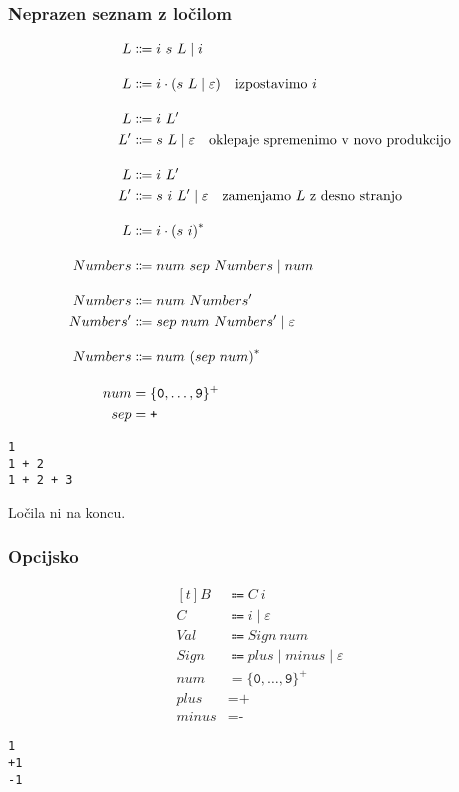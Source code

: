 \documentclass{report}
\newcommand{\Null}{\varepsilon}
\newcommand{\Char}[1]{\texttt{#1}}
\newcommand{\Seq}{\cdot}
\newcommand{\Spc}{\ }
\newcommand{\Union}{\mathrel{|}}
\newcommand{\Kleene}[1]{{#1}^\ast}
\newcommand{\KleenePlus}[1]{#1^+}
\newcommand{\Arrow}{\Coloneq}
\newcommand{\NT}[1]{{#1}}
\newcommand{\T}[1]{{#1}}
\begin{document}
\subsubsection{Neprazen seznam z ločilom}
\begin{equation*}
  \begin{aligned}[t]
    \NT{L} &\Arrow \T{i} \Spc \T{s} \Spc \NT{L} \Union \T{i}\\[1em]
    \NT{L} &\Arrow \T{i} \Seq (\T{s} \Spc \NT{L} \Union \Null)\text{\quad izpostavimo $\T{i}$}\\[1em]
    \NT{L} &\Arrow \T{i} \Spc \NT{L'}\\
    \NT{L'} &\Arrow \T{s} \Spc \NT{L} \Union \Null \text{\quad oklepaje spremenimo v novo produkcijo}\\[1em]
    \NT{L} &\Arrow \T{i} \Spc \NT{L'}\\
    \NT{L'} &\Arrow \T{s} \Spc \T{i} \Spc \NT{L'} \Union \Null \text{\quad zamenjamo $\NT{L}$ z desno stranjo}\\[1em]
    \NT{L} &\Arrow \T{i} \Seq \Kleene{(\T{s} \Spc \T{i})}\\[1em]
    \NT{Numbers} &\Arrow \T{num} \Spc \T{sep} \Spc \NT{Numbers} \Union \T{num}\\[1em]
    \NT{Numbers} &\Arrow \T{num} \Spc \NT{Numbers'}\\
    \NT{Numbers'} &\Arrow \T{sep} \Spc \T{num} \Spc \NT{Numbers'} \Union \Null\\[1em]
    \NT{Numbers} &\Arrow \T{num} \Spc \Kleene{(\T{sep} \Spc \T{num})}\\[1em]
    \T{num} &= \KleenePlus{\{\Char{0}, \dots, \Char{9}\}}\\
    \T{sep} &= \Char{+}
  \end{aligned}
\end{equation*}
\begin{lstlisting}
1
1 + 2
1 + 2 + 3
\end{lstlisting}
Ločila ni na koncu.

\subsubsection{Opcijsko}
\begin{equation*}
  \begin{aligned}[t]
    \NT{B} &\Arrow \NT{C} \Spc \T{i}\\
    \NT{C} &\Arrow \T{i} \Union \Null \\[1em]
    \NT{Val} &\Arrow \NT{Sign} \Spc \T{num}\\
    \NT{Sign} &\Arrow \T{plus} \Union \T{minus} \Union \Null\\[1em]
    \T{num} &= \KleenePlus{\{\Char{0}, \dots, \Char{9}\}}\\
    \T{plus} &= \Char{+}\\
    \T{minus} &= \Char{-}
  \end{aligned}
\end{equation*}
\begin{lstlisting}
1
+1
-1
\end{lstlisting}
\end{document}
